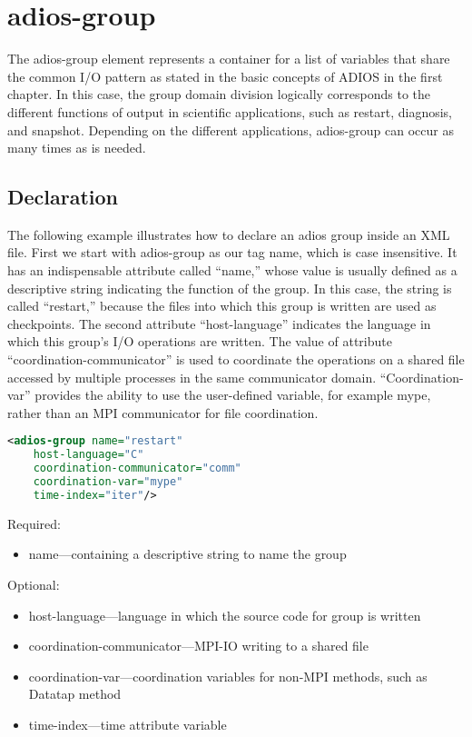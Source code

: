 \section{adios-group}
The adios-group element represents a container for a list of variables that share 
the common I/O pattern as stated in the basic concepts of ADIOS in the first chapter. 
In this case, the group domain division logically corresponds to the different 
functions of output in scientific applications, such as restart, diagnosis, and 
snapshot. Depending on the different applications, adios-group can occur as many 
times as is needed.


\subsection{Declaration}

The following example illustrates how to declare an adios group inside an XML file. 
First we start with adios-group as our tag name, which is case insensitive. It 
has an indispensable attribute called ``name,'' whose value is usually defined 
as a descriptive string indicating the function of the group. In this case, the 
string is called ``restart,'' because the files into which this group is written 
are used as checkpoints. The second attribute ``host-language'' indicates the language 
in which this group's I/O operations are written. The value of attribute ``coordination-communicator'' 
is used to coordinate the operations on a shared file accessed by multiple processes 
in the same communicator domain. ``Coordination-var'' provides the ability to use 
the user-defined variable, for example mype, rather than an MPI communicator for 
file coordination. 

\begin{lstlisting}[language=XML]
<adios-group name="restart"
	host-language="C"
	coordination-communicator="comm"
	coordination-var="mype"
	time-index="iter"/>
\end{lstlisting}

Required:
\begin{itemize}
\item name---containing a descriptive string to name the group
\end{itemize}

Optional:
\begin{itemize}
\item host-language---language in which the source code for group is written
\item coordination-communicator---MPI-IO writing to a shared file
\item coordination-var---coordination variables for non-MPI methods, such as Datatap method
\item time-index---time attribute variable
\end{itemize}


